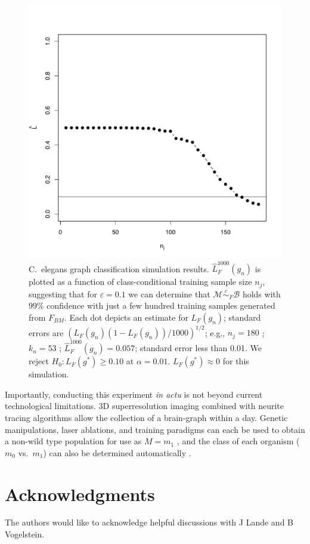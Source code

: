 \documentclass{article}
\newcommand{\mB}{\mathcal{B}}
\newcommand{\mM}{\mathcal{M}}
\newcommand{\hL}{\widehat{L}}
\newcommand{\MeB}{\mM \overset{\varepsilon}{{\sim}}_F \mB}
\providecommand{\tr}[1]{\textcolor{black}{#1}}
\begin{document}
\begin{figure}[!ht]
\centering \includegraphics[width=.5\linewidth]{Lhatplot}
\caption{C.~elegans graph classification simulation results. $\hL^{1000}_{F}(g_n)$ is plotted as a function of class-conditional training sample size $n_j$, suggesting that for $\varepsilon=0.1$ we can determine that $\MeB$ holds with $99\%$ confidence with just a few hundred training samples generated from $F_{BM}$. Each dot depicts an estimate for $L_{F}(g_n)$; standard errors are $(L_{F}(g_n)(1-L_{F}(g_n))/1000)^{1/2}$\tr{; e}.g., $n_j = 180$ ; $k_n = 53$ ; $\hL^{1000}_{F}(g_n) = 0.057$; standard error less than 0.01. We reject $H_0: L_{F}(g^*) \geq 0.10$ at $\alpha=0.01$. $L_{F}(g^*) \approx 0$ for this simulation.
}
\label{fig1}
\end{figure}


Importantly, conducting this experiment {\it in actu} is not beyond current technological limitations. 3D superresolution imaging \cite{VaziriShank08} combined with neurite tracing algorithms \cite{HelmstaedterDenk08,Mishchenko09,LuLichtman09} allow the collection of a brain-graph within a day. Genetic manipulations, laser ablations, and training paradigms can each be used to obtain a non-wild type population for use as $M=m_1$ \cite{deBonoMaricq05}, and the class of each organism ($m_0$ vs.~$m_1$) can also be determined automatically \cite{BuckinghamSattelle08}.


\section{Acknowledgments}

The authors would like to acknowledge helpful discussions with J Lande and B Vogelstein. 




\end{document}
